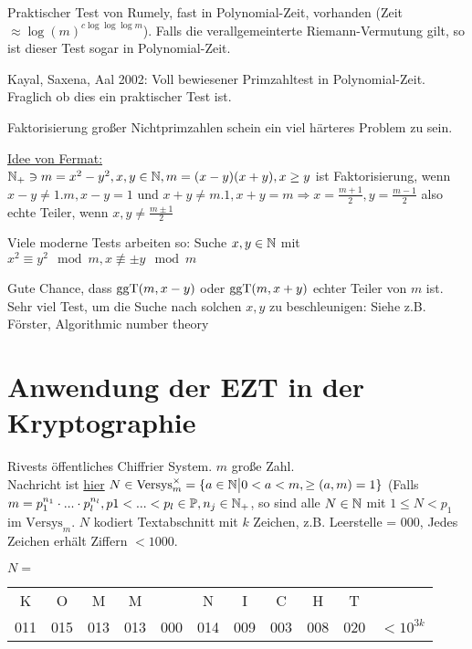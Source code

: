 \documentclass[a4paper,DIV15,BCOR12mm]{article}
\begin{document}
Praktischer Test von Rumely, fast in Polynomial-Zeit, vorhanden
(Zeit $\approx \log(m)^{c\log \log \log m}$). Falls die
verallgemeinterte Riemann-Vermutung gilt, so ist dieser Test sogar
in Polynomial-Zeit.

Kayal, Saxena, Aal 2002: Voll bewiesener Primzahltest in
Polynomial-Zeit. Fraglich ob dies ein praktischer Test ist.

Faktorisierung großer Nichtprimzahlen schein ein viel härteres
Problem zu sein.

\underline{Idee von Fermat:}\\
$\mathbb{N}_+ \ni m = x^2 - y^2, x,y \in \mathbb{N}, m = (x-y)(x+y), x \ge y$
ist Faktorisierung, wenn $x-y \not= 1.m, x-y = 1$ und $x + y \not=
m.1, x+y = m \Rightarrow x = \frac{m+1}{2}, y = \frac{m-1}{2}$ also
echte Teiler, wenn $x,y \not= \frac{m \pm 1}{2}$

Viele moderne Tests arbeiten so: Suche $x,y \in \mathbb{N}$ mit $x^2
\equiv y^2 \mod m, x \not\equiv \pm y \mod m$

Gute Chance, dass $\mathop{\rm ggT}\nolimits (m, x-y)$ oder $\mathop{\rm ggT}\nolimits (m, x+y)$ echter Teiler
von $m$ ist. Sehr viel Test, um die Suche nach solchen $x,y$ zu
beschleunigen: Siehe z.B. Förster, Algorithmic number theory

\section{Anwendung der EZT in der Kryptographie}
Rivests öffentliches Chiffrier System. $m$ große Zahl.\\
Nachricht ist \underline{hier} $N \in \text{Versys}_m^\times = \{a
\in \mathbb{N} \big| 0 < a < m, \ge (a,m) = 1\}$ (Falls $m =
p_1^{n_1}\cdot ... \cdot p_l^{n_l}, p1 < ... < p_l \in \mathbb{P}, n_j \in
\mathbb{N}_+$, so sind alle $N \in \mathbb{N}$ mit $1 \le N < p_1$ im
$\text{Versys}_m$. $N$ kodiert Textabschnitt mit $k$ Zeichen, z.B.
Leerstelle = $000$, Jedes Zeichen erhält Ziffern $< 1000$.
\begin{beispiel}
    $\text{ }$\\
    $N =$ \begin{tabular}{ccccccccccr}
        K & O & M & M & & N & I & C & H & T & \\
        011 & 015 & 013 & 013 & 000 & 014 & 009 & 003 & 008 & 020 & $< 10^{3k}$
    \end{tabular}
\end{beispiel}
\end{document}
